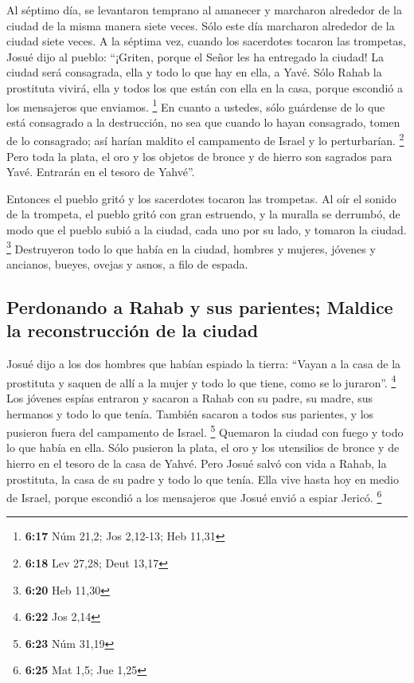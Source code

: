 \begin{paracol}{2}
 Al séptimo día, se levantaron temprano al amanecer y
marcharon alrededor de la ciudad de la misma manera siete veces. Sólo
este día marcharon alrededor de la ciudad siete veces.  A
la séptima vez, cuando los sacerdotes tocaron las trompetas, Josué dijo
al pueblo: ``¡Griten, porque el Señor les ha entregado la ciudad!
 La ciudad será consagrada, ella y todo lo que hay en
ella, a Yavé. Sólo Rahab la prostituta vivirá, ella y todos los que
están con ella en la casa, porque escondió a los mensajeros que
enviamos. \footnote{\textbf{6:17} Núm 21,2; Jos 2,12-13; Heb 11,31}
 En cuanto a ustedes, sólo guárdense de lo que está
consagrado a la destrucción, no sea que cuando lo hayan consagrado,
tomen de lo consagrado; así harían maldito el campamento de Israel y lo
perturbarían. \footnote{\textbf{6:18} Lev 27,28; Deut 13,17}
 Pero toda la plata, el oro y los objetos de bronce y de
hierro son sagrados para Yavé. Entrarán en el tesoro de Yahvé''.

 Entonces el pueblo gritó y los sacerdotes tocaron las
trompetas. Al oír el sonido de la trompeta, el pueblo gritó con gran
estruendo, y la muralla se derrumbó, de modo que el pueblo subió a la
ciudad, cada uno por su lado, y tomaron la ciudad. \footnote{\textbf{6:20}
  Heb 11,30}  Destruyeron todo lo que había en la ciudad,
hombres y mujeres, jóvenes y ancianos, bueyes, ovejas y asnos, a filo de
espada.

\hypertarget{perdonando-a-rahab-y-sus-parientes-maldice-la-reconstrucciuxf3n-de-la-ciudad}{%
\subsection{Perdonando a Rahab y sus parientes; Maldice la
reconstrucción de la
ciudad}\label{perdonando-a-rahab-y-sus-parientes-maldice-la-reconstrucciuxf3n-de-la-ciudad}}

 Josué dijo a los dos hombres que habían espiado la
tierra: ``Vayan a la casa de la prostituta y saquen de allí a la mujer y
todo lo que tiene, como se lo juraron''. \footnote{\textbf{6:22} Jos
  2,14}  Los jóvenes espías entraron y sacaron a Rahab
con su padre, su madre, sus hermanos y todo lo que tenía. También
sacaron a todos sus parientes, y los pusieron fuera del campamento de
Israel. \footnote{\textbf{6:23} Núm 31,19}  Quemaron la
ciudad con fuego y todo lo que había en ella. Sólo pusieron la plata, el
oro y los utensilios de bronce y de hierro en el tesoro de la casa de
Yahvé.  Pero Josué salvó con vida a Rahab, la prostituta,
la casa de su padre y todo lo que tenía. Ella vive hasta hoy en medio de
Israel, porque escondió a los mensajeros que Josué envió a espiar
Jericó. \footnote{\textbf{6:25} Mat 1,5; Jue 1,25}


\end{paracol}
